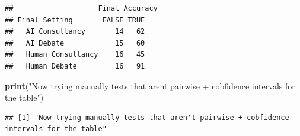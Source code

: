 \documentclass[
]{article}
\newenvironment{Shaded}{\begin{snugshade}}{\end{snugshade}}
\newcommand{\FunctionTok}[1]{\textcolor[rgb]{0.13,0.29,0.53}{\textbf{#1}}}
\newcommand{\NormalTok}[1]{#1}
\newcommand{\StringTok}[1]{\textcolor[rgb]{0.31,0.60,0.02}{#1}}
\begin{document}
\begin{verbatim}
##                    Final_Accuracy
## Final_Setting       FALSE TRUE
##   AI Consultancy       14   62
##   AI Debate            15   60
##   Human Consultancy    16   45
##   Human Debate         16   91
\end{verbatim}

\begin{Shaded}
\begin{Highlighting}[]
\FunctionTok{print}\NormalTok{(}\StringTok{"Now trying manually tests that aren\textquotesingle{}t pairwise + cobfidence intervals for the table"}\NormalTok{)}
\end{Highlighting}
\end{Shaded}

\begin{verbatim}
## [1] "Now trying manually tests that aren't pairwise + cobfidence intervals for the table"
\end{verbatim}
\end{document}
